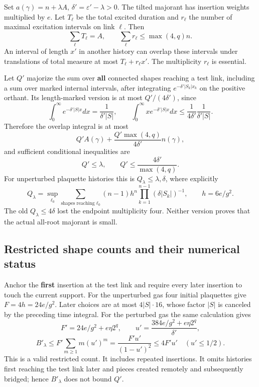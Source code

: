 \documentclass[11pt,a4paper]{article}
\begin{document}
Set \(a(\gamma)=n+\lambda A\), \(\delta'=\varepsilon'-\lambda>0\). The
tilted majorant has insertion weights multiplied by \(e\). Let
\(T_\ell\) be the total excited duration and \(r_\ell\) the number of
maximal excitation intervals on link \(\ell\). Then
\[\sum_\ell T_\ell=A,\qquad
 \sum_\ell r_\ell\le\max(4,q)n.\] An interval of length \(x'\) in
another history can overlap these intervals under translations of total
measure at most \(T_\ell+r_\ell x'\). The multiplicity \(r_\ell\) is
essential.

Let \(Q'\) majorize the sum over \textbf{all} connected shapes reaching
a test link, including a sum over marked internal intervals, after
integrating \(e^{-\delta'|S_k|x_k}\) on the positive orthant. Its
length-marked version is at most \(Q'/(4\delta')\), since
\[\int_0^\infty e^{-\delta'|S|x}dx=\frac1{\delta'|S|},\qquad
 \int_0^\infty xe^{-\delta'|S|x}dx
 \le\frac1{4\delta'}\frac1{\delta'|S|}.\] Therefore the overlap integral
is at most \[Q'A(\gamma)+\frac{Q'\max(4,q)}{4\delta'}n(\gamma),\] and
sufficient conditional inequalities are
\[Q'\le\lambda,\qquad Q'\le\frac{4\delta'}{\max(4,q)}.\] For unperturbed
plaquette histories this is \(Q_\lambda\le\lambda,\delta\), where
explicitly \[Q_\lambda=\sup_{\ell_0}\sum_{\text{shapes reaching }\ell_0}
 (n-1)h^n\prod_{k=1}^{n-1}(\delta|S_k|)^{-1},\qquad h=6e/g^2.\] The old
\(Q_\lambda\le4\delta\) lost the endpoint multiplicity four. Neither
version proves that the actual all-root majorant is small.

\hypertarget{restricted-shape-counts-and-their-numerical-status}{%
\subsection{Restricted shape counts and their numerical
status}\label{restricted-shape-counts-and-their-numerical-status}}

Anchor the \textbf{first} insertion at the test link and require every
later insertion to touch the current support. For the unperturbed gas
four initial plaquettes give \(F=4h=24e/g^2\). Later choices are at most
\(4|S|\cdot16\), whose factor \(|S|\) is canceled by the preceding time
integral. For the perturbed gas the same calculation gives
\[F'=24e/g^2+e\eta2^q,\qquad
 u'=\frac{384e/g^2+e\eta2^q}{\delta'},\]
\[B'_\lambda\le F'\sum_{m\ge1}m(u')^m
 =\frac{F'u'}{(1-u')^2}\le4F'u'\quad(u'\le1/2).\] This is a valid
restricted count. It includes repeated insertions. It omits histories
first reaching the test link later and pieces created remotely and
subsequently bridged; hence \(B'_\lambda\) does not bound \(Q'\).
\end{document}
